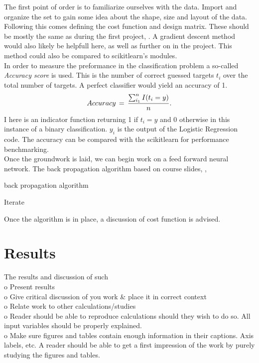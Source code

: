 \documentclass[12pt, a4paper]{scrartcl}
\begin{document}
    The first point of order is to familiarize ourselves with the data. Import and organize the set to gain some 
idea about the shape, size and layout of the data. Following this comes defining the cost function and design matrix.
These should be mostly the same as during the first project, \cite{project1}. A gradient descent method would also likely be 
helpfull here, as well as further on in the project. This method could also be compared to scikitlearn's modules. \\

    In order to measure the preformance in the classification problem a so-called \textit{Accuracy score} is used. This is 
the number of correct guessed targets $t_i$ over the total number of targets. A perfect classifier would yield an accuracy of 1.
\begin{align}
    Accuracy \,=\, \frac{ \sum_{i_1}^n I\qty( t_i = y ) }{ n }.
\label{eq:accuracy}
\end{align}
I here is an indicator function returning 1 if $t_i = y$ and 0 otherwise in this instance of a binary classification. $y_i$ 
is the output of the Logistic Regression code. The accuracy can be compared with the scikitlearn for performance benchmarking. \\


    Once the groundwork is laid, we can begin work on a feed forward neural network. The back propagation algorithm based on course
slides, \cite{slides}, 
\begin{algorithm}
\caption{back propagation algorithm}
\begin{algorithmic}
\STATE Iterate
\ENDFOR
\end{algorithmic}
\label{algo:backpropagation}
\end{algorithm}

    Once the algorithm is in place, a discussion of cost function is advised. 


\section{Results}
    The results and discussion of such\\
    o   Present results \\
    o   Give critical discussion of you work \& place it in correct context\\
    o   Relate work to other calculations/studies\\
    o   Reader should be able to reproduce calculations should they wish to do so. 
        All input variables should be properly explained. \\
    o   Make sure figures and tables contain enough information in their captions. 
        Axis labels, etc. A reader should be able to get a first impression of the work
        by purely studying the figures and tables. \\
\end{document}
